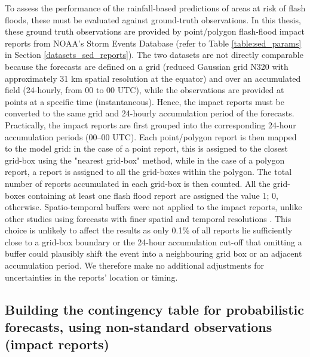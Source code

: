To  assess the performance of the rainfall-based predictions of areas at risk of flash floods, these must be evaluated against ground-truth observations. In this thesis, these ground truth observations are provided by point/polygon flash-flood impact reports from NOAA’s Storm Events Database (refer to Table \ref{table:sed_params} in Section \ref{datasets_sed_reports}). The two datasets are not directly comparable because the forecasts are defined on a grid (reduced Gaussian grid N320 with approximately 31 km spatial resolution at the equator) and over an accumulated field (24-hourly, from 00 to 00 UTC), while the observations are provided at points at a specific time (instantaneous). Hence, the impact reports must be converted to the same grid and 24-hourly accumulation period of the forecasts. Practically, the impact reports are first grouped into the corresponding 24-hour accumulation periods (00–00 UTC). Each point/polygon report is then mapped to the model grid: in the case of a point report, this is assigned to the closest grid-box using the "nearest grid-box" method, while in the case of a polygon report, a report is assigned to all the grid-boxes within the polygon. The total number of reports accumulated in each grid-box is then counted. All the grid-boxes containing at least one flash flood report are assigned the value 1; 0, otherwise. Spatio-temporal buffers were not applied to the impact reports, unlike other studies using forecasts with finer spatial and temporal resolutions \citep{Cavaiola_2024}. This choice is unlikely to affect the results as only 0.1\% of all reports lie sufficiently close to a grid-box boundary or the 24-hour accumulation cut-off that omitting a buffer could plausibly shift the event into a neighbouring grid box or an adjacent accumulation period. We therefore make no additional adjustments for uncertainties in the reports' location or timing.


\subsection{Building the contingency table for probabilistic forecasts, using non-standard observations (impact reports)}
\label{flash_flood_focused_verification_rainfall_based_ff_verif_framework_contingency_table}

